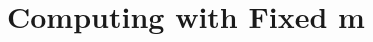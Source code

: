 \documentclass{article}
\begin{document}










\section{Computing with Fixed m}





\end{document}
